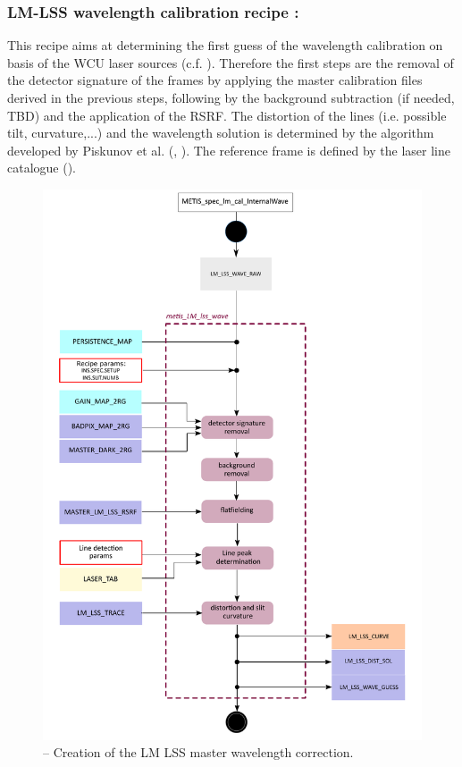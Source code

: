 \clearpage
\subsubsection{LM-LSS wavelength calibration recipe :}\label{rec:lsslmwave}
This recipe aims at determining the first guess of the wavelength calibration on basis of the \ac{WCU} laser sources (c.f. \cite{METIS-calibration_plan}). Therefore the first steps are the removal of the detector signature of the  frames by applying the master calibration files derived in the previous steps, following by the background subtraction (if needed, TBD) and the application of the RSRF. The distortion of the lines (i.e. possible tilt, curvature,...) and the wavelength solution is determined by the algorithm developed by Piskunov et al. (\cite{pis02}, \cite{pis21}). The reference frame is defined by the laser line catalogue (\hyperref[dataitem:laser_tab]{}).

\begin{figure}[ht]
  \centering
  \includegraphics[width=0.5\textheight]{figures/metis_lm_lss_wave_v0.82.pdf}
  \caption[Recipe: ]{ --
    Creation of the LM LSS master wavelength correction.}
  \label{Fig:rec_lm_lss_trace}
\end{figure}
\clearpage

